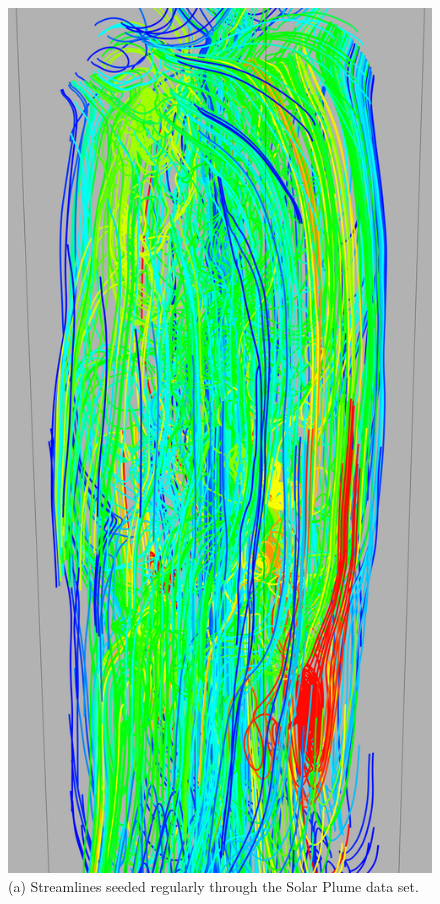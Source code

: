 \documentclass[journal]{vgtc}                %
\begin{document}
\begin{figure}[t]
	\centering
		\begin{minipage}{0.47\linewidth}
			\centering \small
			\includegraphics[height = 2\linewidth]{Images/plume_all_crop.png}\\(a) Streamlines seeded regularly through the Solar Plume data set. \vspace{0.2em}

\end{minipage}
\end{figure}
\end{document}
